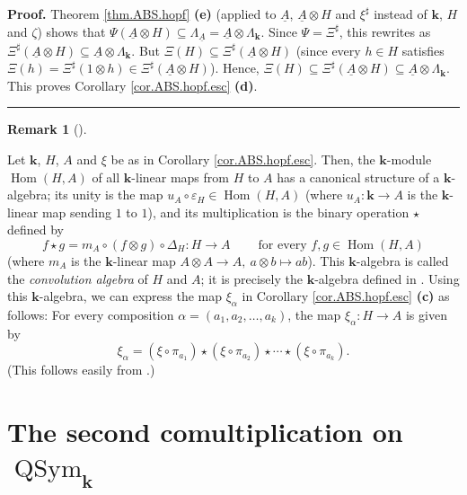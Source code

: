 \documentclass[numbers=enddot,12pt,final,onecolumn,notitlepage,abstracton]{scrartcl}%
\theoremstyle{definition}
\newtheorem{remk}[theo]{Remark}
\newenvironment{remark}[1][]
{\begin{remk}[#1]\begin{leftbar}}
{\end{leftbar}\end{remk}}
\newenvironment{proof}[1][Proof]{\noindent\textbf{#1.} }{\ \rule{0.5em}{0.5em}}
\begin{document}
\begin{proof}
Theorem \ref{thm.ABS.hopf} \textbf{(e)} (applied to $\underline{A}$,
$\underline{A}\otimes H$ and $\xi^{\sharp}$ instead of $\mathbf{k}$, $H$ and
$\zeta$) shows that $\Psi\left(  \underline{A}\otimes H\right)  \subseteq
\Lambda_{\underline{A}}=\underline{A}\otimes\Lambda_{\mathbf{k}}$. Since
$\Psi=\Xi^{\sharp}$, this rewrites as $\Xi^{\sharp}\left(  \underline{A}%
\otimes H\right)  \subseteq\underline{A}\otimes\Lambda_{\mathbf{k}}$. But
$\Xi\left(  H\right)  \subseteq\Xi^{\sharp}\left(  \underline{A}\otimes
H\right)  $ (since every $h\in H$ satisfies $\Xi\left(  h\right)  =\Xi
^{\sharp}\left(  1\otimes h\right)  \in\Xi^{\sharp}\left(  \underline{A}%
\otimes H\right)  $). Hence, $\Xi\left(  H\right)  \subseteq\Xi^{\sharp
}\left(  \underline{A}\otimes H\right)  \subseteq\underline{A}\otimes
\Lambda_{\mathbf{k}}$. This proves Corollary \ref{cor.ABS.hopf.esc}
\textbf{(d)}.
\end{proof}

\begin{remark}
\label{rmk.xi1.convolution}Let $\mathbf{k}$, $H$, $A$ and $\xi$ be as in
Corollary \ref{cor.ABS.hopf.esc}. Then, the $\mathbf{k}$-module
$\operatorname*{Hom}\left(  H,A\right)  $ of all $\mathbf{k}$-linear maps from
$H$ to $A$ has a canonical structure of a $\mathbf{k}$-algebra; its unity is
the map $u_{A}\circ\varepsilon_{H}\in\operatorname*{Hom}\left(  H,A\right)  $
(where $u_{A}:\mathbf{k}\rightarrow A$ is the $\mathbf{k}$-linear map sending
$1$ to $1$), and its multiplication is the binary operation $\star$ defined by%
\[
f\star g=m_{A}\circ\left(  f\otimes g\right)  \circ\Delta_{H}:H\rightarrow
A\ \ \ \ \ \ \ \ \ \ \text{for every }f,g\in\operatorname*{Hom}\left(
H,A\right)
\]
(where $m_{A}$ is the $\mathbf{k}$-linear map $A\otimes A\rightarrow
A,\ a\otimes b\mapsto ab$). This $\mathbf{k}$-algebra is called the
\textit{convolution algebra} of $H$ and $A$; it is precisely the $\mathbf{k}%
$-algebra defined in \cite[Definition 1.4.1]{Reiner}. Using this $\mathbf{k}%
$-algebra, we can express the map $\xi_{\alpha}$ in Corollary \ref{cor.ABS.hopf.esc}
\textbf{(c)} as follows: For every composition $\alpha=\left(  a_{1}%
,a_{2},\ldots,a_{k}\right)  $, the map $\xi_{\alpha}:H\rightarrow A$ is given
by%
\[
\xi_{\alpha}=\left(  \xi\circ\pi_{a_{1}}\right)  \star\left(  \xi\circ
\pi_{a_{2}}\right)  \star\cdots\star\left(  \xi\circ\pi_{a_{k}}\right)  .
\]
(This follows easily from \cite[Exercise 1.4.23]{Reiner}.)
\end{remark}

\section{The second comultiplication on $\operatorname*{QSym}%
\nolimits_{\mathbf{k}}$}
\end{document}
